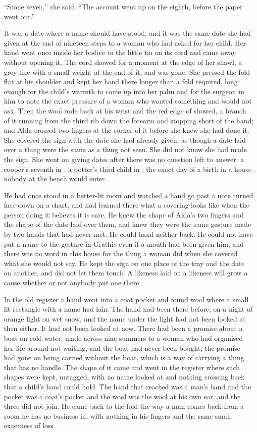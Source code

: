 “Stone seven,” she said. “The account went up on the eighth, before the paper went out.”

It was a date where a name should have stood, and it was the same date she had given at the end of nineteen steps to a woman who had asked for her child. Her hand went once inside her bodice to the little tin on its cord and came away without opening it. The cord showed for a moment at the edge of her shawl, a grey line with a small weight at the end of it, and was gone. She pressed the fold flat at his shoulder and kept her hand there longer than a fold required, long enough for the child's warmth to come up into her palm and for the surgeon in him to note the exact pressure of a woman who wanted something and would not ask. Then the wool rode back at his wrist and the red edge of  showed, a branch of it running from the third rib down the forearm and stopping short of the hand; and Alda crossed two fingers at the corner of it before she knew she had done it. She covered the sign with the date she had already given, as though a date laid over a thing were the same as a thing not seen. She did not know she had made the sign. She went on giving dates after there was no question left to answer: a cooper's seventh in , a potter's third child in , the exact day of a birth in a house nobody at the bench would enter.

He had once stood in a better-lit room and watched a hand go past a note turned face-down on a chart, and had learned there what a covering looks like when the person doing it believes it is care. He knew the shape of Alda's two fingers and the shape of the date laid over them, and knew they were the same gesture made by two hands that had never met. He could hand neither back. He could not have put a name to the gesture in Grathic even if a mouth had been given him, and there was no word in this house for the thing a woman did when she covered what she would not say. He kept the sign on one place of the tray and the date on another, and did not let them touch. A likeness laid on a likeness will grow a cause whether or not anybody put one there.

In the old register a hand went into a coat pocket and found wool where a small lit rectangle with a name had lain. The hand had been there before, on a night of orange light on wet snow, and the name under the light had not been looked at then either. It had not been looked at now. There had been a promise about a boat on cold water, made across nine summers to a woman who had organised her life around not waiting, and the boat had never been bought; the promise had gone on being carried without the boat, which is a way of carrying a thing that has no handle. The shape of it came and went in the register where such shapes were kept, untagged, with no name looked at and nothing crossing back that a child's hand could hold. The hand that reached was a man's hand and the pocket was a coat's pocket and the wool was the wool at his own ear, and the three did not join. He came back to the fold the way a man comes back from a room he has no business in, with nothing in his fingers and the same small exactness of loss.

